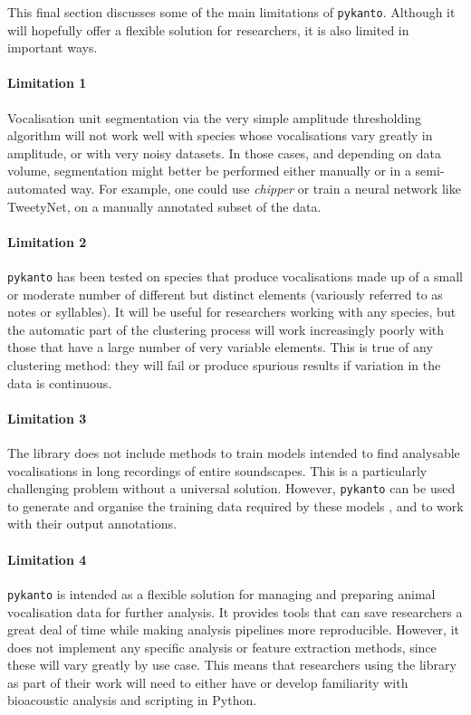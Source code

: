 This final section discusses some of the main limitations of \texttt{pykanto}. Although it
will hopefully offer a flexible solution for researchers, it is also limited in
important ways.

\paragraph{Limitation 1} Vocalisation unit segmentation via the very simple amplitude
thresholding algorithm will not work well with species whose vocalisations vary
greatly in amplitude, or with very noisy datasets. In those cases, and depending
on data volume,  segmentation might better be performed either manually or in a
semi-automated way. For example, one could use \textit{chipper}
\parencite{searfoss2020a} or train a neural network like TweetyNet,
\parencite{cohen2022} on a manually annotated subset of the data.

\paragraph{Limitation 2} \texttt{pykanto} has been tested on species that produce
vocalisations made up of a small or moderate number of different but distinct
elements (variously referred to as notes or syllables). It will be useful for
researchers working with any species, but the automatic part of the clustering
process will work increasingly poorly with those that have a large number of
very variable elements. This is true of any clustering method: they will fail or
produce spurious results if variation in the data is continuous.

\paragraph{Limitation 3} The library does not include methods to train models intended to
find analysable vocalisations in long recordings of entire soundscapes. This is
a particularly challenging problem \parencite{priyadarshani2018} without a universal
solution. However, \texttt{pykanto} can be used to generate and organise the training
data required by these models \parencite{kahl2021, stowell2019, stowell2014}, and to
work with their output annotations.

\paragraph{Limitation 4} \texttt{pykanto} is intended as a flexible solution for managing
and preparing animal vocalisation data for further analysis. It provides tools
that can save researchers a great deal of time while making analysis pipelines
more reproducible. However, it does not implement any specific analysis or
feature extraction methods, since these will vary greatly by use case. This
means that researchers using the library as part of their work will need to
either have or develop familiarity with bioacoustic analysis and scripting in
Python.

